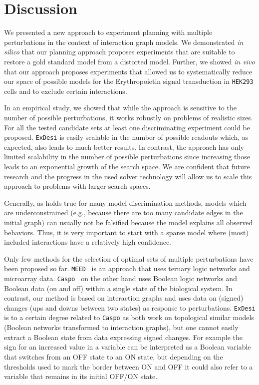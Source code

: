 
\section{Discussion}

We presented a new approach to experiment planning with multiple perturbations
in the context of interaction graph models.
We demonstrated \emph{in silico} that our planning approach proposes experiments
that are suitable to restore a gold standard model from a distorted model.
Further, we showed \emph{in vivo} that our approach proposes experiments that
allowed us to systematically reduce our space of possible models for the
Erythropoietin signal transduction in \texttt{HEK293} cells and
to exclude certain interactions.

In an empirical study, we showed that while the approach is sensitive to the number of possible perturbations,
it works robustly on problems of realistic sizes.
For all the tested candidate sets at least one discriminating experiment could be proposed.
\texttt{ExDesi} is easily scalable in the number of possible readouts which, as expected,
also leads to much better results.
In contrast, the approach has only limited scalability in the number of possible perturbations
since increasing those leads to an exponential growth of the search space.
We are confident that future research and the progress in the used solver technology
will allow us to scale this approach to problems with larger search spaces.

Generally, as holds true for many model discrimination methods,
models which are underconstrained (e.g., because there are too many candidate edges in the initial graph)
can usually not be falsified because the model explains all observed behaviors.
Thus, it is very important to start with a sparse model
where (most) included interactions have a relatively high confidence.

Only few methods for the selection of optimal sets of multiple perturbations have
been proposed so far.
\texttt{MEED}~\cite{szczurek2009} is an approach that uses ternary logic networks and microarray data.
\texttt{Caspo}~\cite{videla2015} on the other hand uses Boolean logic networks and Boolean data (on and off) within a single state of the biological system.
In contrast, our method is based on interaction graphs and uses data on (signed) changes (ups and downs between two states) as response to perturbations.
\texttt{ExDesi} is to a certain degree related to \texttt{Caspo} as both work on topological similar models (Boolean networks transformed to interaction graphs),
but one cannot easily extract a Boolean state from data expressing signed changes.
For example the sign for an increased value in a variable can be interpreted as a Boolean variable that switches from an OFF state to an ON state,
but depending on the thresholds used to mark the border between ON and OFF it could also refer to a variable that remains in its initial OFF/ON state.

